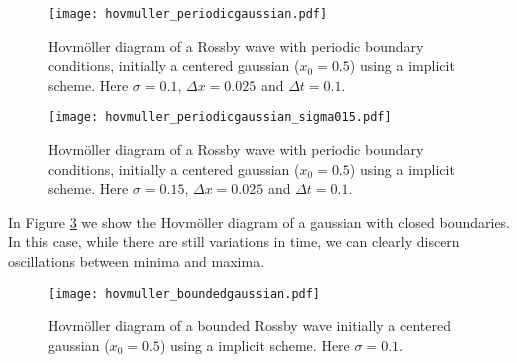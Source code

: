 \begin{figure}[htbp]
	\centering
	\texttt{[image: hovmuller\_periodicgaussian.pdf]}
	\caption{Hovmöller diagram of a Rossby wave with periodic boundary conditions, initially a centered gaussian ($x_0=0.5$) using a implicit scheme. Here $\sigma = 0.1$, $\Delta x = 0.025$ and $\Delta t = 0.1$.}
	\label{fig:hovmollerGaussianPeriodic01}
\end{figure}

\begin{figure}[htbp]
	\centering
	\texttt{[image: hovmuller\_periodicgaussian\_sigma015.pdf]}
	\caption{Hovmöller diagram of a Rossby wave with periodic boundary conditions, initially a centered gaussian ($x_0=0.5$) using a implicit scheme. Here $\sigma = 0.15$, $\Delta x = 0.025$ and $\Delta t = 0.1$.}
	\label{fig:hovmollerGaussianPeriodic015}
\end{figure}

In Figure \ref{fig:hovmollerGaussianBounded} we show the Hovmöller diagram of a gaussian with closed boundaries. In this case, while there are still variations in time, we can clearly discern oscillations between minima and maxima. 
\begin{figure}[htbp]
	\centering
	\texttt{[image: hovmuller\_boundedgaussian.pdf]}
	\caption{Hovmöller diagram of a bounded Rossby wave initially a centered gaussian ($x_0=0.5$) using a implicit scheme. Here $\sigma = 0.1$.}
	\label{fig:hovmollerGaussianBounded}
\end{figure}

